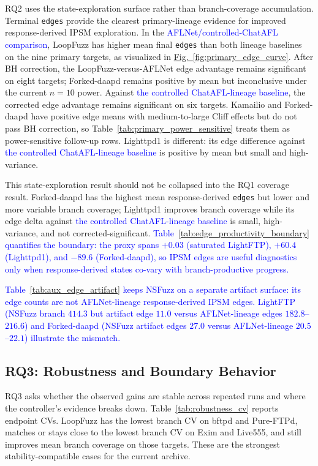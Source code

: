 \documentclass[final,5p,times,number]{elsarticle}
\newcommand{\figref}[1]{\hyperref[#1]{Fig.~\ref*{#1}}}
\begin{document}
RQ2 uses the state-exploration surface rather than branch-coverage accumulation. Terminal \texttt{edges} provide the clearest primary-lineage evidence for improved response-derived IPSM exploration. In the \textcolor{blue}{AFLNet/controlled-ChatAFL comparison}, LoopFuzz has higher mean final \texttt{edges} than both lineage baselines on the nine primary targets, as visualized in \figref{fig:primary_edge_curve}. After BH correction, the LoopFuzz-versus-AFLNet edge advantage remains significant on eight targets; Forked-daapd remains positive by mean but inconclusive under the current $n=10$ power. Against \textcolor{blue}{the controlled ChatAFL-lineage baseline}, the corrected edge advantage remains significant on six targets. Kamailio and Forked-daapd have positive edge means with medium-to-large Cliff effects but do not pass BH correction, so Table~\ref{tab:primary_power_sensitive} treats them as power-sensitive follow-up rows. Lighttpd1 is different: its edge difference against \textcolor{blue}{the controlled ChatAFL-lineage baseline} is positive by mean but small and high-variance.

This state-exploration result should not be collapsed into the RQ1 coverage result. Forked-daapd has the highest mean response-derived \texttt{edges} but lower and more variable branch coverage; Lighttpd1 improves branch coverage while its edge delta against \textcolor{blue}{the controlled ChatAFL-lineage baseline} is small, high-variance, and not corrected-significant. \textcolor{blue}{Table~\ref{tab:edge_productivity_boundary} quantifies the boundary: the proxy spans $+0.03$ (saturated LightFTP), $+60.4$ (Lighttpd1), and $-89.6$ (Forked-daapd), so IPSM edges are useful diagnostics only when response-derived states co-vary with branch-productive progress.}

\textcolor{blue}{Table~\ref{tab:aux_edge_artifact} keeps NSFuzz on a separate artifact surface: its edge counts are not AFLNet-lineage response-derived IPSM edges. LightFTP (NSFuzz branch $414.3$ but artifact edge $11.0$ versus AFLNet-lineage edges $182.8$--$216.6$) and Forked-daapd (NSFuzz artifact edges $27.0$ versus AFLNet-lineage $20.5$--$22.1$) illustrate the mismatch.}

\subsection{RQ3: Robustness and Boundary Behavior}

RQ3 asks whether the observed gains are stable across repeated runs and where the controller's evidence breaks down. Table~\ref{tab:robustness_cv} reports endpoint CVs. LoopFuzz has the lowest branch CV on bftpd and Pure-FTPd, matches or stays close to the lowest branch CV on Exim and Live555, and still improves mean branch coverage on those targets. These are the strongest stability-compatible cases for the current archive.
\end{document}
